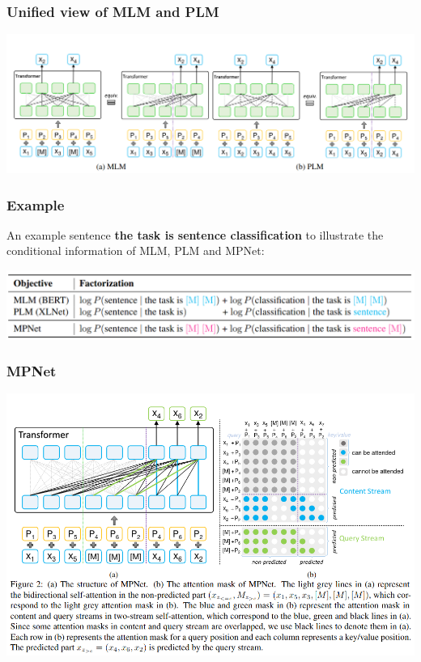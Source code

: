 \documentclass{beamer}
\begin{document}
\begin{frame}
    \frametitle{Unified view of MLM and PLM}
    \begin{center}
        \includegraphics[scale=0.30]{img/mpnet_mlm_plm.png}
    \end{center}
\end{frame}

\begin{frame}
    \frametitle{Example}
    An example sentence \textbf{the task is sentence classification} to illustrate the conditional information of MLM, PLM and MPNet:
    \begin{center}
        \includegraphics[scale=0.29]{img/mpnet_example.png}
    \end{center}
\end{frame}

\begin{frame}
    \frametitle{MPNet}
    \begin{center}
        \includegraphics[scale=0.30]{img/mpnet.png}
    \end{center}
\end{frame}
\end{document}
